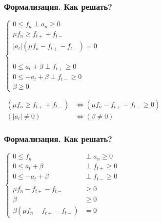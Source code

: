 \documentclass{beamer}
\begin{document}
\begin{frame}[t]
\frametitle{Формализация. Как решать?}
    \small \bigskip \bigskip \medskip
    $
    \begin{cases}
        0 \le f_n \perp a_n \ge 0 \\
        \mu f_n \ge f_{t+} + f_{t-} \\
        |a_t| (\mu f_n - f_{t+} - f_{t-}) = 0 \\
        \\ \\ \\
        0 \le a_t + \beta \perp f_{t+} \ge 0 \\
        0 \le -a_t + \beta \perp f_{t-} \ge 0 \\
        \beta \ge 0
    \end{cases}
    $ 

    \bigskip
    $
    \begin{aligned}
    (\mu f_n \ge f_{t+} + f_{t-}) &\iff (\mu f_n - f_{t+} - f_{t-} \ge 0) \\
    (|a_t| \ne 0) &\iff (\beta \ne 0)
    \end{aligned}
    $

\end{frame}


\begin{frame}[t]
\frametitle{Формализация. Как решать?}
    \small \bigskip \bigskip \medskip
    $
    \begin{cases}
        0 \le f_n &\perp a_n \ge 0 \\
        0 \le a_t + \beta &\perp f_{t+} \ge 0 \\
        0 \le -a_t + \beta &\perp f_{t-} \ge 0 \\
        \\
        \mu f_n - f_{t+} - f_{t-} &\ge 0  \\
        \beta &\ge 0 \\
        \beta (\mu f_n - f_{t+} - f_{t-}) &= 0
    \end{cases}
    $ 
\end{frame}
\end{document}
